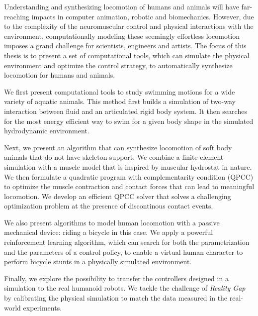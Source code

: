 Understanding and synthesizing locomotion of humans and animals will have far-reaching impacts in computer animation, robotic and biomechanics. However, due to the complexity of the neuromuscular control and physical interactions with the environment, computationally modeling these seemingly effortless locomotion imposes a grand challenge for scientists, engineers and artists. The focus of this thesis is to present a set of computational tools, which can simulate the physical environment and optimize the control strategy, to automatically synthesize locomotion for humans and animals.

We first present computational tools to study swimming motions for a wide variety of aquatic animals. This method first builds a simulation of two-way interaction between fluid and an articulated rigid body system. It then searches for the most energy efficient way to swim for a given body shape in the simulated hydrodynamic environment.

Next, we present an algorithm that can synthesize locomotion of soft body animals that do not have skeleton support. We combine a finite element simulation with a muscle model that is inspired by muscular hydrostat in nature. We then formulate a quadratic program with complementarity condition (QPCC) to optimize the muscle contraction and contact forces that can lead to meaningful locomotion. We develop an efficient QPCC solver that solves a challenging optimization problem at the presence of discontinous contact events.

We also present algorithms to model human locomotion with a passive mechanical device: riding a bicycle in this case. We apply a powerful reinforcement learning algorithm, which can search for both the parametrization and the parameters of a control policy, to enable a virtual human character to perform bicycle stunts in a physically simulated environment.

Finally, we explore the possibility to transfer the controllers designed in a simulation to the real humanoid robots. We tackle the challenge of \emph{Reality Gap} by calibrating the physical simulation to match the data measured in the real-world experiments.
